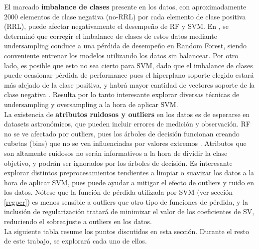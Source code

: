 El marcado \textbf{imbalance de clases} presente en los datos, con aproximadamente 2000 elementos de clase negativa (no-RRL) por cada elemento de clase positiva (RRL), puede afectar negativamente el desempeño de RF y SVM. En \cite{jbc}, se determinó que corregir el imbalance de clases de estos datos mediante undersampling conduce a una pérdida de desempeño en Random Forest, siendo conveniente entrenar los modelos utilizando los datos sin balancear. Por otro lado, es posible que esto no sea cierto para SVM, dado que el imbalance de clases puede ocasionar pérdida de performance pues el hiperplano soporte elegido estará más alejado de la clase positiva, y habrá mayor cantidad de vectores soporte de la clase negativa \cite{imbalanced_svm}. Resulta por lo tanto interesante explorar diversas técnicas de undersampling y oversampling a la hora de aplicar SVM. \\

La existencia de \textbf{atributos ruidosos y outliers} en los datos es de esperarse en datasets astronómicos, que pueden incluir errores de medición y observación. RF no se ve afectado por outliers, pues los árboles de decisión funcionan creando cubetas (bins) que no se ven influenciadas por valores extremos \cite{statisticallearning}. Atributos que son altamente ruidosos no serán informativos a la hora de dividir la clase objetivo, y podrán ser ignorados por los árboles de decisión. Es interesante explorar distintos preprocesamientos tendientes a limpiar o suavizar los datos a la hora de aplicar SVM, pues puede ayudar a mitigar el efecto de outliers y ruido en los datos. Nótese que la función de pérdida utilizada por SVM (ver sección \ref{regper}) es menos sensible a outliers que otro tipo de funciones de pérdida, y la inclusión de regularización tratará de minimizar el valor de los coeficientes de SV, reduciendo el sobreajuste a outliers en los datos.\\

La siguiente tabla resume los puntos discutidos en esta sección. Durante el resto de este trabajo, se explorará cada uno de ellos. 

